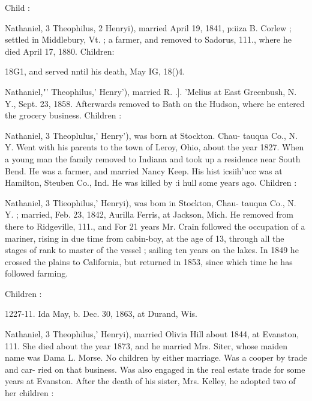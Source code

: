 \documentclass[oneside]{book}
\begin{document}
Child : 


Nathaniel, 3 Theophilus, 2 Henryi), married April 19, 1841, p:iiza 
B. Corlew ; settled in Middlebury, Vt. ; a farmer, and removed 
to Sadorus, 111., where he died April 17, 1880. Children: 


18G1, and served nntil his death, May IG, 18()4. 


Nathaniel,"' Theophilus,' Henry'), married R. .]. 'Melius at East 
Greenbush, N. Y., Sept. 23, 1858. Afterwards removed to Bath 
on the Hudson, where he entered the grocery business. Children : 






Nathaniel, 3 Theoplulus,' Henry'), was born at Stockton. Chau- 
tauqua Co., N. Y. Went with his parents to the town of Leroy, 
Ohio, about the year 1827. When a young man the family 
removed to Indiana and took up a residence near South Bend. 
He was a farmer, and married Nancy Keep. His hist icsiih'ucc 
was at Hamilton, Steuben Co., Ind. He was killed by :i hull 
some years ago. Children : 









Nathaniel, 3 Tlieophilus,' Henryi), was bom in Stockton, Chau- 
tauqua Co., N. Y. ; married, Feb. 23, 1842, Aurilla Ferris, at 
Jackson, Mich. He removed from there to Ridgeville, 111., and 
For 21 years Mr. Crain followed the occupation of a mariner, 
rising in due time from cabin-boy, at the age of 13, through all 
the stages of rank to master of the vessel ; sailing ten years on 
the lakes. In 1849 he crossed the plains to California, but 
returned in 1853, since which time he has followed farming. 

Children : 













1227-11. Ida May, b. Dec. 30, 1863, at Durand, Wis. 



Nathaniel, 3 Theophilus,' Henryi), married Olivia Hill about 
1844, at Evanston, 111. She died about the year 1873, and he 
married Mrs. Siter, whose maiden name was Dama L. Morse. 
No children by either marriage. Was a cooper by trade and car- 
ried on that business. Was also engaged in the real estate trade 
for some years at Evanston. After the death of his sister, Mrs. 
Kelley, he adopted two of her children : 
\end{document}
